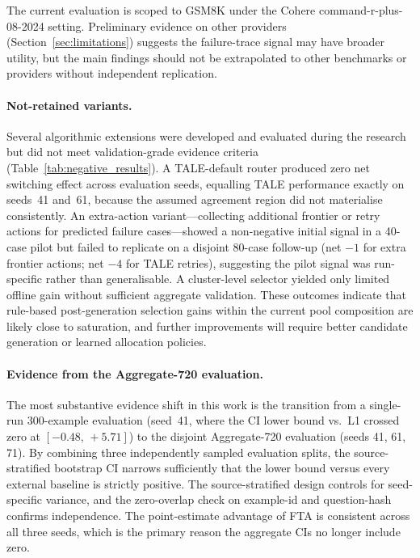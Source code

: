 The current evaluation is scoped to GSM8K under the Cohere
command-r-plus-08-2024 setting.
Preliminary evidence on other providers (Section~\ref{sec:limitations}) suggests
the failure-trace signal may have broader utility, but the main findings should
not be extrapolated to other benchmarks or providers without independent
replication.

\paragraph{Not-retained variants.}
Several algorithmic extensions were developed and evaluated during the research
but did not meet validation-grade evidence criteria
(Table~\ref{tab:negative_results}).
A TALE-default router produced zero net switching effect across evaluation
seeds, equalling TALE performance exactly on seeds~41 and~61, because the
assumed agreement region did not materialise consistently.
An extra-action variant---collecting additional frontier or retry actions for
predicted failure cases---showed a non-negative initial signal in a 40-case
pilot but failed to replicate on a disjoint 80-case follow-up
(net $-1$ for extra frontier actions; net $-4$ for TALE retries), suggesting
the pilot signal was run-specific rather than generalisable.
A cluster-level selector yielded only limited offline gain without sufficient
aggregate validation.
These outcomes indicate that rule-based post-generation selection gains within
the current pool composition are likely close to saturation, and further
improvements will require better candidate generation or learned allocation
policies.

\paragraph{Evidence from the Aggregate-720 evaluation.}
The most substantive evidence shift in this work is the transition from a
single-run 300-example evaluation (seed~41, where the CI lower bound vs.\ L1
crossed zero at $[-0.48,\, +5.71]$) to the disjoint Aggregate-720 evaluation
(seeds 41, 61, 71).
By combining three independently sampled evaluation splits, the
source-stratified bootstrap CI narrows sufficiently that the lower bound
versus every external baseline is strictly positive.
The source-stratified design controls for seed-specific variance, and the
zero-overlap check on example-id and question-hash confirms independence.
The point-estimate advantage of FTA is consistent across all three seeds,
which is the primary reason the aggregate CIs no longer include zero.

